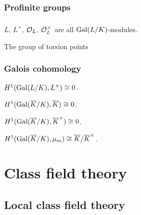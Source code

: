 \documentclass{../../large}
\begin{document}
\section{Profinite groups}

\section{}

\begin{prb}
\begin{parts}
\item $L$, $L^\times$, $\mathcal{O}_L$, $\mathcal{O}_L^\times$ are all $\operatorname{Gal}(L/K)$-modules.
\item The group of torsion points
\end{parts}
\end{prb}

\begin{prb}
\end{prb}


\section{Galois cohomology}
\begin{prb}
\end{prb}

\begin{prb}
\end{prb}

\begin{prb}[Hilbert 90]
\begin{parts}
\item $H^1(\operatorname{Gal}(L/K),L^\times)\cong0$.
\item $H^1(\operatorname{Gal}(\overline K/K),\overline K)\cong0$.
\item $H^1(\operatorname{Gal}(\overline K/K),\overline K^\times)\cong0$.
\item $H^1(\operatorname{Gal}(\overline K/K),\mu_m)\cong\overline K/\overline K^\times$.
\end{parts}
\end{prb}
\begin{pf}
\end{pf}





\part{Class field theory}
\chapter{Local class field theory}
\end{document}
